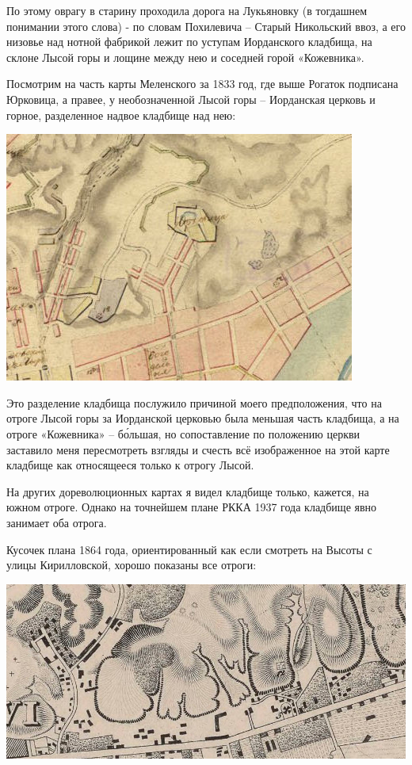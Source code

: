 По этому оврагу в старину проходила дорога на Лукьяновку (в тогдашнем понимании этого слова) - по словам Похилевича – Старый Никольский ввоз, а его низовье над нотной фабрикой лежит по уступам Иорданского кладбища, на склоне Лысой горы и лощине между нею и соседней горой «Кожевника».

Посмотрим на часть карты Меленского за 1833 год, где выше Рогаток подписана Юрковица, а правее, у необозначенной Лысой горы – Иорданская церковь и горное, разделенное надвое кладбище над нею:

\begin{center}
\includegraphics[width=\linewidth]{chast-kirvys/lys02/1833-melenskiy.jpg}
\end{center}

Это разделение кладбища послужило причиной моего предположения, что на отроге Лысой горы за Иорданской церковью была меньшая часть кладбища, а на отроге «Кожевника» – б\'ольшая, но сопоставление по положению церкви заставило меня пересмотреть взгляды и счесть всё изображенное на этой карте кладбище как относящееся только к отрогу Лысой. 

На других дореволюционных картах я видел кладбище только, кажется, на южном отроге. Однако на точнейшем плане РККА 1937 года кладбище явно занимает оба отрога.

Кусочек плана 1864 года, ориентированный как если смотреть на Высоты с улицы Кирилловской, хорошо показаны все отроги:

\begin{center}
\includegraphics[width=\linewidth]{chast-kirvys/lys02/1846-y.jpg}
\end{center}

